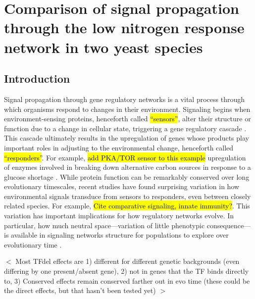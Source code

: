 \chapter{Comparison of signal propagation through the low nitrogen response network in two yeast species}
\label{chpt:networks}

\section{Introduction}

Signal propagation through gene regulatory networks is a vital process through which organisms respond to changes in their environment. Signaling begins when environment-sensing proteins, henceforth called \hl{``sensors''}, alter their structure or function due to a change in cellular state, triggering a gene regulatory cascade \cite{Bahn2007}. This cascade ultimately results in the upregulation of genes whose products play important roles in adjusting to the environmental change, henceforth called \hl{``responders''}. For example, \hl{add PKA/TOR sensor to this example} upregulation of enzymes involved in breaking down alternative carbon sources in response to a glucose shortage \cite{Gancedo1998}. While protein function can be remarkably conserved over long evolutionary timescales, recent studies have found surprising variation in how environmental signals transduce from sensors to responders, even between closely related species. For example, \hl{Cite comparative signaling, innate immunity?}. This variation has important implications for how regulatory networks evolve. In particular, how much neutral space---variation of little phenotypic consequence---is available in signaling networks structure for populations to explore over evolutionary time \cite{Payne2015}.

$<$ Most TFdel effects are 1) different for different genetic backgrounds (even differing by one present/absent gene), 2) not in genes that the TF binds directly to, 3) Conserved effects remain conserved farther out in evo time (these could be the direct effects, but that hasn't been tested yet) $>$

